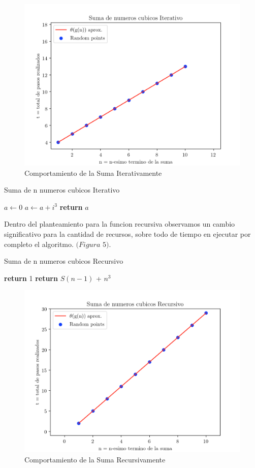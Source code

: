 \documentclass[12pt,twoside]{article}
\begin{document}
\begin{figure}
  \centering
    \includegraphics[height=0.5\textwidth]{Figure4}
  \caption{Comportamiento de la Suma Iterativamente}
  \label{fig:ejemplo3}
\end{figure}

\begin{algorithm}
  \caption{Suma de n numeros cubicos Iterativo}\label{euclid}
  \begin{algorithmic}[1]
    \State $a\gets0$
      \State $a\gets a + i^3$
    \EndFor
      \State \textbf{return} $a$
  \EndFunction
  \end{algorithmic}
\end{algorithm}

Dentro del planteamiento para la funcion recursiva observamos un cambio significativo para la cantidad de recursos, sobre todo
de tiempo en ejecutar por completo el algoritmo. $(Figura$ $5)$.

\begin{algorithm}
  \caption{Suma de n numeros cubicos Recursivo}\label{euclid}
  \begin{algorithmic}[1]
      \State \textbf{return} 1
    \Else
      \State \textbf{return} $S(n-1)$ + $n^3$
    \EndIf
  \EndFunction
  \end{algorithmic}
\end{algorithm}

\begin{figure}
  \centering
    \includegraphics[height=0.5\textwidth]{Figure5}
  \caption{Comportamiento de la Suma Recursivamente}
  \label{fig:ejemplo3}
\end{figure}
\end{document}
